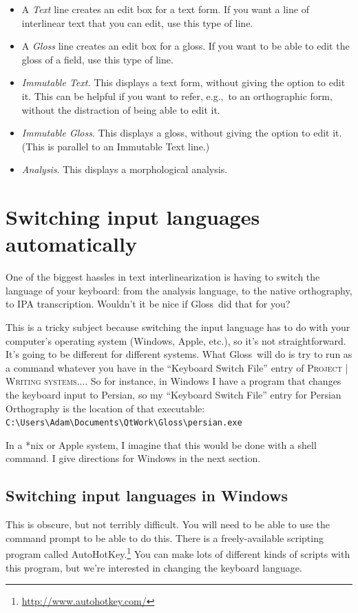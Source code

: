 \documentclass[oneside]{book}
\def\eg{e.g.,~}
\def\menu#1{\textsc{#1}}
\def\menu#1#2{\textsc{#1 | #2}}
\def\gloss{\textsf{Gloss}}
\begin{document}
\begin{itemize}
\item A \emph{Text} line creates an edit box for a text form. If you want a line of interlinear text that you can edit, use this type of line.
\item A \emph{Gloss} line creates an edit box for a gloss. If you want to be able to edit the gloss of a field, use this type of line.
\item \emph{Immutable Text.} This displays a text form, without giving the option to edit it. This can be helpful if you want to refer, \eg to an orthographic form, without the distraction of being able to edit it.
\item \emph{Immutable Gloss}. This displays a gloss, without giving the option to edit it. (This is parallel to an Immutable Text line.)
\item \emph{Analysis}. This displays a morphological analysis.
\end{itemize}

\section{Switching input languages automatically}\label{sect:switching-input-languages}
One of the biggest hassles in text interlinearization is having to switch the language of your keyboard: from the analysis language, to the native orthography, to IPA transcription. Wouldn't it be nice if \gloss\ did that for you?

This is a tricky subject because switching the input language has to do with your computer's operating system (Windows, Apple, etc.), so it's not straightforward. It's going to be different for different systems. What \gloss\ will do is try to run as a command whatever you have in the ``Keyboard Switch File'' entry of \menu{Project}{Writing systems...}. So for instance, in Windows I have a program that changes the keyboard input to Persian, so my ``Keyboard Switch File'' entry for Persian Orthography is the location of that executable:\\ \verb+C:\Users\Adam\Documents\QtWork\Gloss\persian.exe+

In a *nix or Apple system, I imagine that this would be done with a shell command. I give directions for Windows in the next section.

\subsection{Switching input languages in Windows}
This is obscure, but not terribly difficult. You will need to be able to use the command prompt to be able to do this. There is a freely-available scripting program called AutoHotKey.\footnote{\url{http://www.autohotkey.com/}}  You can make lots of different kinds of scripts with this program, but we're interested in changing the keyboard language.
\end{document}
